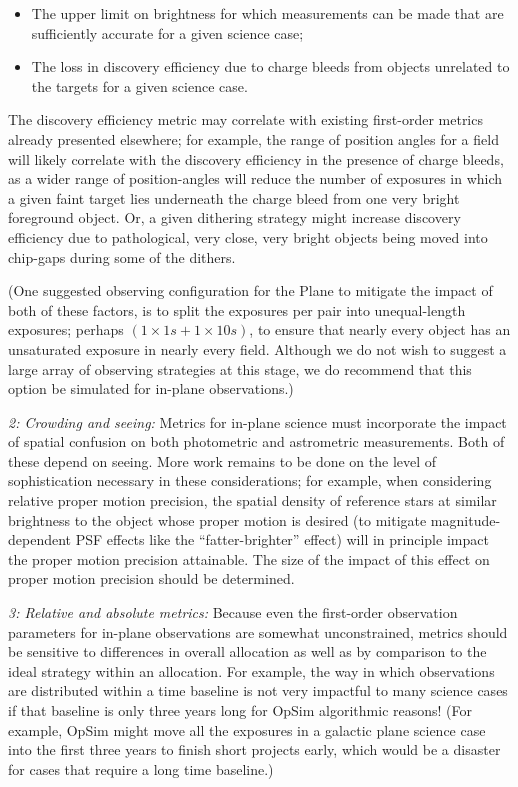 \begin{itemize}

  \item The upper limit on brightness for which measurements can be made that are sufficiently accurate for a given science case;
  
  \item The loss in discovery efficiency due to charge bleeds from objects unrelated to the targets for a given science case.
  
\end{itemize}

The discovery efficiency metric may correlate with existing
first-order metrics already presented elsewhere; for example, the
range of position angles for a field will likely correlate with the
discovery efficiency in the presence of charge bleeds, as a wider
range of position-angles will reduce the number of exposures in which
a given faint target lies underneath the charge bleed from one very
bright foreground object. Or, a given dithering strategy might
increase discovery efficiency due to pathological, very close, very
bright objects being moved into chip-gaps during some of the dithers.

(One suggested observing configuration for the Plane to mitigate the
impact of both of these factors, is to split the exposures per pair
into unequal-length exposures; perhaps $(1 \times 1s + 1\times 10s)$,
to ensure that nearly every object has an unsaturated exposure in
nearly every field. Although we do not wish to suggest a large array
of observing strategies at this stage, we do recommend that this
option be simulated for in-plane observations.)

{\it 2: Crowding and seeing:} Metrics for in-plane science must
incorporate the impact of spatial confusion on both photometric and
astrometric measurements. Both of these depend on seeing. More work
remains to be done on the level of sophistication necessary in these
considerations; for example, when considering relative proper motion
precision, the spatial density of reference stars at similar
brightness to the object whose proper motion is desired (to mitigate
magnitude-dependent PSF effects like the ``fatter-brighter'' effect)
will in principle impact the proper motion precision attainable. The
size of the impact of this effect on proper motion precision should be
determined.

{\it 3: Relative and absolute metrics:} Because even the first-order
observation parameters for in-plane observations are somewhat
unconstrained, metrics should be sensitive to differences in overall
allocation as well as by comparison to the ideal strategy within an
allocation. For example, the way in which observations are distributed
within a time baseline is not very impactful to many science cases if
that baseline is only three years long for OpSim algorithmic reasons!
(For example, OpSim might move all the exposures in a galactic plane
science case into the first three years to finish short projects
early, which would be a disaster for cases that require a long time
baseline.)

